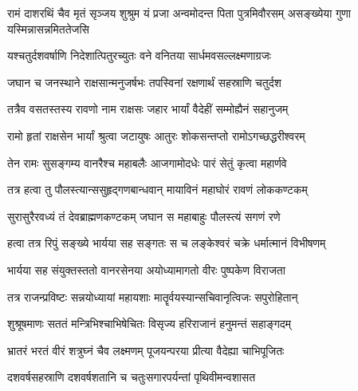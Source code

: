 
\translink{}

\storymeta



\threelineshloka
{रामं दाशरथिं चैव मृतं सृञ्जय शुश्रुम}
{यं प्रजा अन्वमोदन्त पिता पुत्रमिवौरसम्}
{असङ्ख्येया गुणा यस्मिन्नासन्नमिततेजसि}


\twolineshloka
{यश्चतुर्दशवर्षाणि निदेशात्पितुरच्युतः}
{वने वनितया सार्धमवसल्लक्ष्मणाग्रजः}


\twolineshloka
{जघान च जनस्थाने राक्षसान्मनुजर्षभः}
{तपस्विनां रक्षणार्थं सहस्राणि चतुर्दश}


\twolineshloka
{तत्रैव वसतस्तस्य रावणो नाम राक्षसः}
{जहार भार्यां वैदेहीं सम्मोह्यैनं सहानुजम्}


\twolineshloka
{रामो हृतां राक्षसेन भार्यां श्रुत्वा जटायुषः}
{आतुरः शोकसन्तप्तो रामोऽगच्छद्धरीश्वरम्}


\twolineshloka
{तेन रामः सुसङ्गम्य वानरैश्च महाबलैः}
{आजगामोदधेः पारं सेतुं कृत्वा महार्णवे}


\twolineshloka
{तत्र हत्वा तु पौलस्त्यान्ससुहृद्गणबान्धवान्}
{मायाविनं महाघोरं रावणं लोककण्टकम्}


\twolineshloka
{सुरासुरैरवध्यं तं देवब्राह्मणकण्टकम्}
{जघान स महाबाहुः पौलस्त्यं सगणं रणे}


\twolineshloka
{हत्वा तत्र रिपुं सङ्ख्ये भार्यया सह सङ्गतः}
{स च लङ्केश्वरं चक्रे धर्मात्मानं विभीषणम्}


\twolineshloka
{भार्यया सह संयुक्तस्ततो वानरसेनया}
{अयोध्यामागतो वीरः पुष्पकेण विराजता}


\twolineshloka
{तत्र राजन्प्रविष्टः सन्नयोध्यायां महायशाः}
{मातॄर्वयस्यान्सचिवानृत्विजः सपुरोहितान्}


\twolineshloka
{शुश्रूषमाणः सततं मन्त्रिभिश्चाभिषेचितः}
{विसृज्य हरिराजानं हनुमन्तं सहाङ्गदम्}


\twolineshloka
{भ्रातरं भरतं वीरं शत्रुघ्नं चैव लक्ष्मणम्}
{पूजयन्परया प्रीत्या वैदेह्या चाभिपूजितः}


\twolineshloka
{दशवर्षसहस्राणि दशवर्षशतानि च}
{चतुःसगारपर्यन्तां पृथिवीमन्वशासत}


